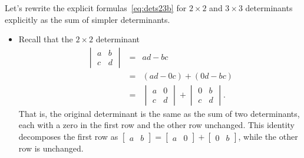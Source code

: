 \begin{example} \label{eg:}
Let's rewrite the explicit formulas~\eqref{eq:dets23b} for \(2\times2\) and \(3\times3\) determinants explicitly as the sum of simpler determinants.
\begin{itemize}
\item Recall that the \(2\times2\) determinant
\begin{eqnarray*}
\begin{vmatrix} a&b\\c&d \end{vmatrix}
&=&ad-bc
\\&=&(ad-0c)+(0d-bc)
\\&=&\begin{vmatrix} a&0\\c&d \end{vmatrix}
+\begin{vmatrix} 0&b\\c&d \end{vmatrix}.
\end{eqnarray*}
That is, the original determinant is the same as the sum of two determinants, each with a zero in the first row and the other row unchanged.
This identity decomposes the first row as \(\begin{bmatrix} a&b \end{bmatrix}=\begin{bmatrix} a&0 \end{bmatrix}+\begin{bmatrix} 0&b \end{bmatrix}\), while the other row is unchanged.


\end{itemize}
\end{example}
